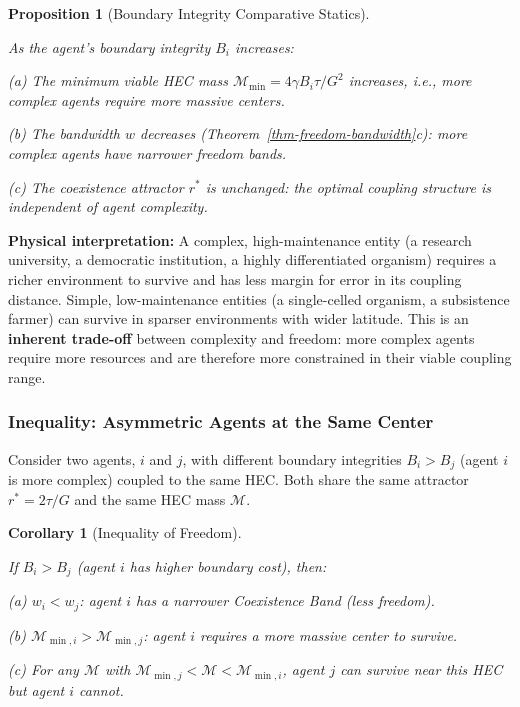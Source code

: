 \documentclass[11pt]{article}
\theoremstyle{plain}
\newtheorem{proposition}[theorem]{Proposition}
\newtheorem{corollary}[theorem]{Corollary}
\theoremstyle{definition}
\theoremstyle{remark}
\let\origsubsubsection\subsubsection
\renewcommand{\subsubsection}{\needspace{4\baselineskip}\origsubsubsection}
\begin{document}
\begin{proposition}[Boundary Integrity Comparative Statics]
\label{prop-boundary-integrity-comparative-statics}

As the agent's boundary integrity $B_i$ increases:

(a) The minimum viable HEC mass $\mathcal{M}_{\min} = 4\gamma B_i \tau / G^2$ increases, i.e., more complex agents require more massive centers.

(b) The bandwidth $w$ decreases (Theorem~\ref{thm-freedom-bandwidth}c): more complex agents have narrower freedom bands.

(c) The coexistence attractor $r^*$ is unchanged: the optimal coupling structure is independent of agent complexity.
\end{proposition}

\textbf{Physical interpretation:} A complex, high-maintenance entity (a
research university, a democratic institution, a highly differentiated
organism) requires a richer environment to survive and has less margin
for error in its coupling distance. Simple, low-maintenance entities (a
single-celled organism, a subsistence farmer) can survive in sparser
environments with wider latitude. This is an \textbf{inherent trade-off}
between complexity and freedom: more complex agents require more
resources and are therefore more constrained in their viable coupling
range.

\subsubsection{Inequality: Asymmetric Agents at the Same
Center}\label{inequality-asymmetric-agents-at-the-same-center}

Consider two agents, \(i\) and \(j\), with different boundary
integrities \(B_i > B_j\) (agent \(i\) is more complex) coupled to the
same HEC. Both share the same attractor \(r^* = 2\tau/G\) and the same
HEC mass \(\mathcal{M}\).

\begin{corollary}[Inequality of Freedom]
\label{cor-inequality-of-freedom}

If $B_i > B_j$ (agent $i$ has higher boundary cost), then:

(a) $w_i < w_j$: agent $i$ has a narrower Coexistence Band (less freedom).

(b) $\mathcal{M}_{\min,i} > \mathcal{M}_{\min,j}$: agent $i$ requires a more massive center to survive.

(c) For any $\mathcal{M}$ with $\mathcal{M}_{\min,j} < \mathcal{M} < \mathcal{M}_{\min,i}$, agent $j$ can survive near this HEC but agent $i$ cannot.
\end{corollary}
\end{document}
